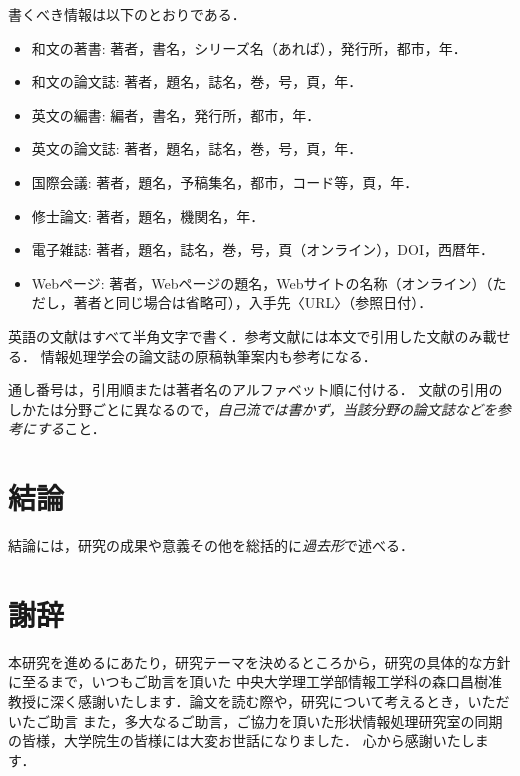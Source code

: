 \documentclass[a4j,12pt]{jreport}
\def\syaji{ \chapter*{謝辞} \addcontentsline{toc}{chapter}{謝辞}}
\begin{document}
書くべき情報は以下のとおりである．
\begin{itemize}
\item 和文の著書: 著者，書名，シリーズ名（あれば），発行所，都市，年．
\item 和文の論文誌: 著者，題名，誌名，巻，号，頁，年．
\item 英文の編書: 編者，書名，発行所，都市，年．
\item 英文の論文誌: 著者，題名，誌名，巻，号，頁，年．
\item 国際会議: 著者，題名，予稿集名，都市，コード等，頁，年．
\item 修士論文: 著者，題名，機関名，年．
\item 電子雑誌: 著者，題名，誌名，巻，号，頁（オンライン），DOI，西暦年．
\item Webページ: 著者，Webページの題名，Webサイトの名称（オンライン）（ただし，著者と同じ場合は省略可），入手先〈URL〉（参照日付）．
\end{itemize}
英語の文献はすべて半角文字で書く．参考文献には本文で引用した文献のみ載せる．
情報処理学会の論文誌の原稿執筆案内\cite{IPSJ}も参考になる．

通し番号は，引用順または著者名のアルファベット順に付ける．
文献の引用のしかたは分野ごとに異なるので，{\em 自己流では書かず，当該分野の論文誌などを参考にする}こと．



\chapter{結論} \label{chapter:6}

結論には，研究の成果や意義その他を総括的に{\em 過去形}で述べる．



\syaji
\par
本研究を進めるにあたり，研究テーマを決めるところから，研究の具体的な方針に至るまで，いつもご助言を頂いた
中央大学理工学部情報工学科の森口昌樹准教授に深く感謝いたします．論文を読む際や，研究について考えるとき，いただいたご助言
また，多大なるご助言，ご協力を頂いた形状情報処理研究室の同期の皆様，大学院生の皆様には大変お世話になりました．
心から感謝いたします．
\end{document}
